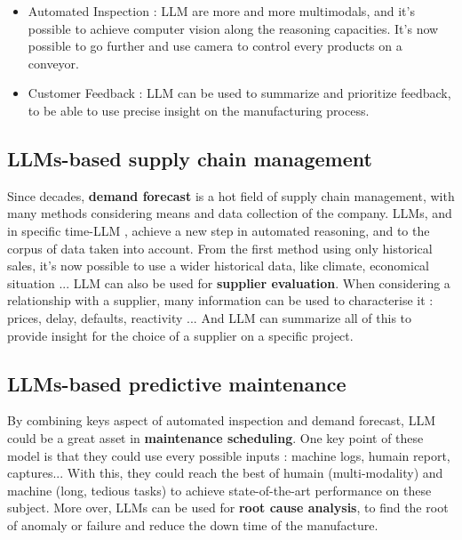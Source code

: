 \begin{itemize}
    \item Automated Inspection : LLM are more and more multimodals, and it's possible to achieve computer vision along the reasoning capacities. It's now possible to go further and use camera to control every products on a conveyor. 
    \item Customer Feedback : LLM can be used to summarize and prioritize feedback, to be able to use precise insight on the manufacturing process.
\end{itemize}

\subsection{LLMs-based supply chain management}
\label{sec:llm_scm}
Since decades, \textbf{demand forecast} is a hot field of supply chain management, with many methods considering means and data collection of the company. LLMs, and in specific time-LLM \cite{timeLLM_2024}, achieve a new step in automated reasoning, and to the corpus of data taken into account. From the first method using only historical sales, it's now possible to use a wider historical data, like climate, economical situation ... LLM can also be used for \textbf{supplier evaluation}. When considering a relationship with a supplier, many information can be used to characterise it : prices, delay, defaults, reactivity ... And LLM can summarize all of this to provide insight for the choice of a supplier on a specific project.   


\subsection{LLMs-based predictive maintenance}
\label{sec:llm_pred_maint}
By combining keys aspect of automated inspection and demand forecast, LLM could be a great asset in \textbf{maintenance scheduling}. One key point of these model is that they could use every possible inputs : machine logs, humain report, captures... With this, they could reach the best of humain (multi-modality) and machine (long, tedious tasks) to achieve state-of-the-art performance on these subject. More over, LLMs can be used for \textbf{root cause analysis}, to find the root of anomaly or failure and reduce the down time of the manufacture. 

